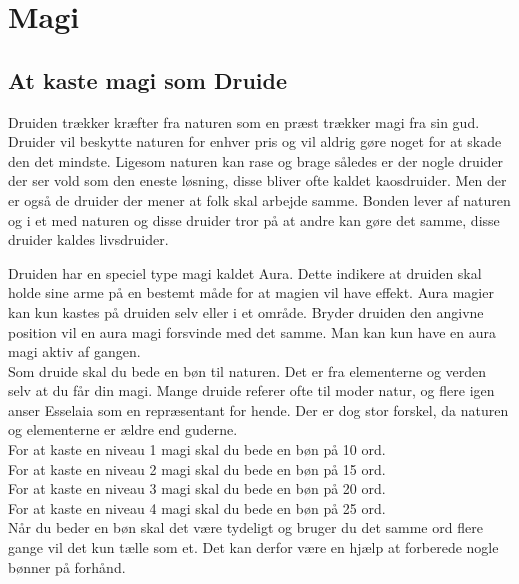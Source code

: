 \chapter*{Magi}



\section*{At kaste magi som Druide}

Druiden trækker kræfter fra naturen som en præst trækker magi fra sin gud. Druider vil beskytte naturen for enhver pris og vil aldrig gøre noget for at skade den det mindste. Ligesom naturen kan rase og brage således er der nogle druider der ser vold som den eneste løsning, disse bliver ofte kaldet kaosdruider. Men der er også de druider der mener at folk skal arbejde samme. Bonden lever af naturen og i et med naturen og disse druider tror på at andre kan gøre det samme, disse druider kaldes livsdruider.

Druiden har en speciel type magi kaldet Aura. Dette indikere at druiden skal holde sine arme på en bestemt måde for at magien vil have effekt. Aura magier kan kun kastes på druiden selv eller i et område. Bryder druiden den angivne position vil en aura magi forsvinde med det samme. Man kan kun have en aura magi aktiv af gangen.\\

Som druide skal du bede en bøn til naturen. Det er fra elementerne og verden selv at du får din magi. Mange druide referer ofte til moder natur, og flere igen anser Esselaia som en repræsentant for hende. Der er dog stor forskel, da naturen og elementerne er ældre end guderne.\\

For at kaste en niveau 1 magi skal du bede en bøn på 10 ord.\\
For at kaste en niveau 2 magi skal du bede en bøn på 15 ord.\\
For at kaste en niveau 3 magi skal du bede en bøn på 20 ord.\\
For at kaste en niveau 4 magi skal du bede en bøn på 25 ord.\\

Når du beder en bøn skal det være tydeligt og bruger du det samme ord flere gange vil det kun tælle som et. Det kan derfor være en hjælp at forberede nogle bønner på forhånd.

